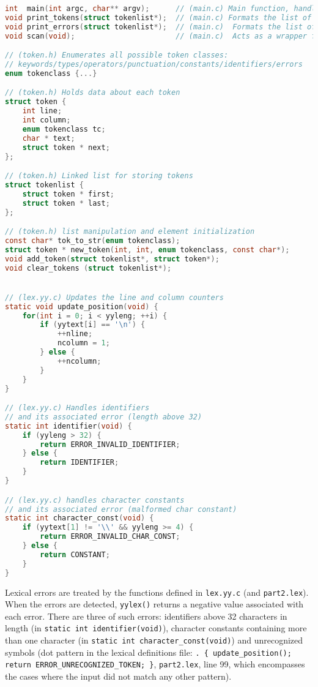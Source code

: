 \documentclass[12pt]{article}
\begin{document}
\begin{lstlisting}[language=C]
int  main(int argc, char** argv);      // (main.c) Main function, handles files and the program arguments
void print_tokens(struct tokenlist*);  // (main.c) Formats the list of tokens
void print_errors(struct tokenlist*);  // (main.c)  Formats the list of errors
void scan(void);                       // (main.c)  Acts as a wrapper for yylex()

// (token.h) Enumerates all possible token classes:
// keywords/types/operators/punctuation/constants/identifiers/errors
enum tokenclass {...}

// (token.h) Holds data about each token
struct token {
	int line;
	int column;
	enum tokenclass tc;
	char * text;
	struct token * next;
};

// (token.h) Linked list for storing tokens
struct tokenlist {
	struct token * first;
	struct token * last;
};

// (token.h) list manipulation and element initialization
const char* tok_to_str(enum tokenclass);
struct token * new_token(int, int, enum tokenclass, const char*);
void add_token(struct tokenlist*, struct token*);
void clear_tokens (struct tokenlist*);


// (lex.yy.c) Updates the line and column counters
static void update_position(void) {
	for(int i = 0; i < yyleng; ++i) {
		if (yytext[i] == '\n') {
			++nline;
			ncolumn = 1;
		} else {
			++ncolumn;
		}
	}
}

// (lex.yy.c) Handles identifiers
// and its associated error (length above 32)
static int identifier(void) {
	if (yyleng > 32) {
		return ERROR_INVALID_IDENTIFIER;
	} else {
		return IDENTIFIER;
	}
}

// (lex.yy.c) handles character constants
// and its associated error (malformed char constant)
static int character_const(void) {
	if (yytext[1] != '\\' && yyleng >= 4) {
		return ERROR_INVALID_CHAR_CONST;
	} else {
		return CONSTANT;
	}
}
\end{lstlisting}

Lexical errors are treated by the functions defined in \texttt{lex.yy.c} (and \texttt{part2.lex}).
When the errors are detected, \texttt{yylex()} returns a negative value associated with each error.
There are three of such errors: identifiers above 32 characters in length
(in \texttt{static int identifier(void)}), character constants containing more than one character
(in \texttt{static int character{\_}const(void)}) and unrecognized symbols (dot pattern
in the lexical definitions file: \texttt{. \{ update{\_}position();}
\texttt{return ERROR{\_}UNRECOGNIZED{\_}TOKEN; \}}, \texttt{part2.lex}, line 99, which encompasses
the cases where the input did not match any other pattern).
\end{document}
